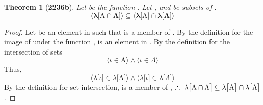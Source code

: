 \documentclass[preview]{standalone}
\newtheorem{theorem}{Theorem}
\begin{document}
\begin{theorem}[\textbf{2236b}]
    Let \bm{$\lambda$} be the function 
    \bm{$\lambda : \Gamma \rightarrow \Delta$}. 
    Let , 
    and \bm{$\Lambda$} be subsets of \bm{$\Gamma$}.
    \begin{equation*}
        \bm{
            \Big \langle \lambda \big[ \mathrm{A} \cap \Lambda \big] \Big \rangle
                \subseteq 
            \Big \langle \lambda \big[ \mathrm{A} \big] \cap \lambda \big[ \Lambda \big] \Big \rangle
        }
    \end{equation*}
\end{theorem}

\begin{proof}
    Let \bm{$\iota$} be an element in \bm{$\Gamma$} such that 
    \bm{$\lambda \big[ \iota \big]$} is a member of 
    . 
    By the definition for the image of 
    under the function \bm{$\lambda$}, 
    \bm{$\iota$} is an element in 
    . 
    By the definition for the
    intersection of sets 
    \begin{equation*}
        \Big \langle \iota \in \mathrm{A} \Big \rangle 
            \land 
        \Big \langle \iota \in \Lambda \Big \rangle
    \end{equation*}
    Thus,
    \begin{equation*}
        \Big \langle 
            \lambda \big[ \iota \big] 
                \in 
            \lambda \big[ \mathrm{A} \big]
        \Big \rangle 
            \land 
        \Big \langle
            \lambda \big[ \iota \big] 
                \in 
            \lambda \big[ \Lambda \big]
        \Big \rangle
    \end{equation*} 
    By the definition for set intersection,
    \bm{$\lambda \big[ \iota \big]$} is a member of
    ,
    $\therefore \text{\space} \relax{
        \lambda \big[ \mathrm{A} \cap \Lambda \big] 
            \subseteq 
        \lambda \big[ \mathrm{A} \big] \cap \lambda \big[ \Lambda \big]
    }$.
\end{proof}
\end{document}
